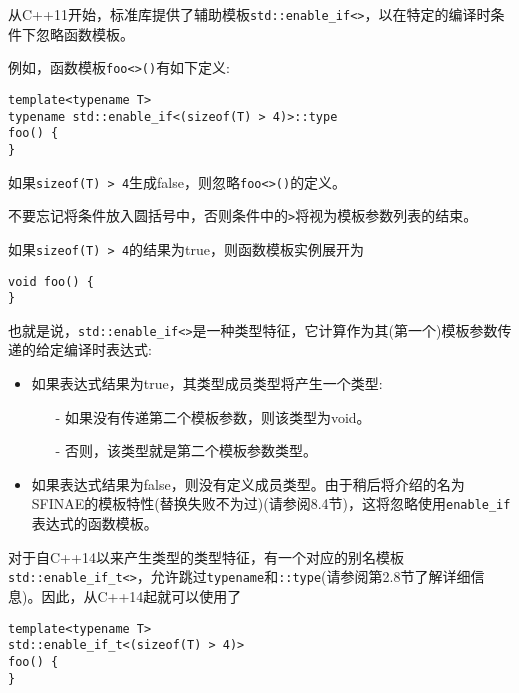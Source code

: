 从C++11开始，标准库提供了辅助模板\texttt{std::enable\_if<>}，以在特定的编译时条件下忽略函数模板。

例如，函数模板\texttt{foo<>()}有如下定义:

\begin{lstlisting}[style=styleCXX]
template<typename T>
typename std::enable_if<(sizeof(T) > 4)>::type
foo() {
}
\end{lstlisting}

如果\texttt{sizeof(T) > 4}生成false，则忽略\texttt{foo<>()}的定义。

\begin{tcolorbox}[colback=webgreen!5!white,colframe=webgreen!75!black]
\hspace*{0.75cm}不要忘记将条件放入圆括号中，否则条件中的\texttt{>}将视为模板参数列表的结束。
\end{tcolorbox}

如果\texttt{sizeof(T) > 4}的结果为true，则函数模板实例展开为

\begin{lstlisting}[style=styleCXX]
void foo() {
}
\end{lstlisting}

也就是说，\texttt{std::enable\_if<>}是一种类型特征，它计算作为其(第一个)模板参数传递的给定编译时表达式:

\begin{itemize}
\item 
如果表达式结果为true，其类型成员类型将产生一个类型:

\begin{itemize}
\item[-]
如果没有传递第二个模板参数，则该类型为void。
	
\item[-]
否则，该类型就是第二个模板参数类型。
\end{itemize}

\item 
如果表达式结果为false，则没有定义成员类型。由于稍后将介绍的名为SFINAE的模板特性(替换失败不为过)(请参阅8.4节)，这将忽略使用\texttt{enable\_if}表达式的函数模板。
\end{itemize}

对于自C++14以来产生类型的类型特征，有一个对应的别名模板\texttt{std::enable\_if\_t<>}，允许跳过\texttt{typename}和\texttt{::type}(请参阅第2.8节了解详细信息)。因此，从C++14起就可以使用了

\begin{lstlisting}[style=styleCXX]
template<typename T>
std::enable_if_t<(sizeof(T) > 4)>
foo() {
}
\end{lstlisting}


